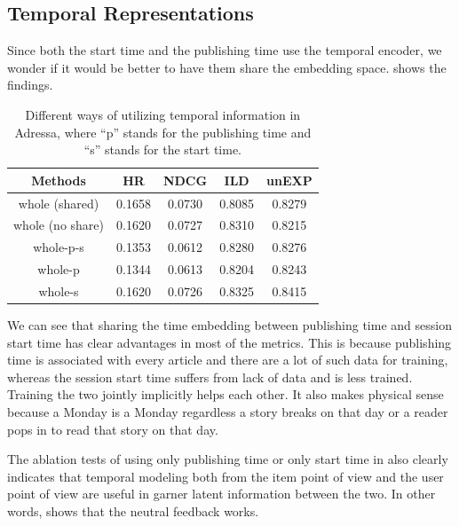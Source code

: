 \subsection{Temporal Representations}
\label{sec:t}
Since both the start time and the publishing time use the temporal encoder, 
we wonder if it would be better to have them share the embedding space. 
 shows the findings. 

\begin{table}[th]
  \caption{Different ways of utilizing temporal information in Adressa, where ``p'' stands for the publishing time and ``s'' stands for the start time.}
  \label{tb:temporal}
  \centering
  \begin{tabular}{c|cccc}
    \toprule
    Methods  & HR & NDCG & ILD & unEXP \\
    \midrule
    whole (shared) & 0.1658 & 0.0730 & 0.8085 & 0.8279\\
    whole (no share) & 0.1620 & 0.0727 & 0.8310 & 0.8215\\
    \midrule
    whole-p-s & 0.1353 & 0.0612 & 0.8280 & 0.8276\\
    whole-p & 0.1344 & 0.0613 & 0.8204 & 0.8243\\
    whole-s & 0.1620 & 0.0726 & 0.8325 & 0.8415\\
    \bottomrule
  \end{tabular}
\end{table}

We can see that sharing the time embedding between publishing time and
session start time has clear advantages in most of the metrics. This is
because publishing time is associated with every article and there are a lot of
such data for training, whereas the session start time suffers from lack
of data and is less trained. Training the two jointly implicitly helps each 
other. It also makes physical sense because a Monday is a Monday regardless
a story breaks on that day or a reader pops in to read that story on that day.

The ablation tests of using only publishing time or only start time in
 also clearly indicates that temporal modeling both from
the item point of view and the user point of view are useful in garner latent
information between the two. In other words,  shows that
the neutral feedback works.

